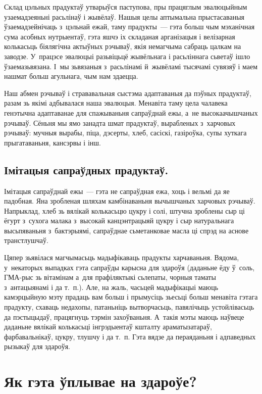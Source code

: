 Склад цэльных прадуктаў утварыўся паступова, пры працяглым эвалюцыйным узаемадзеяньні расьлінаў і жывёлаў. Нашыя целы аптымальна прыстасаваныя ўзаемадзейнічаць з~цэльнай ежай, таму прадукты~--- гэта больш чым мэханічная сума асобных нутрыентаў, гэта яшчэ іх складаная арганізацыя і велізарная колькасьць біялягічна актыўных рэчываў, якія немагчыма сабраць цалкам на заводзе. У~працэсе эвалюцыі разьвіцьцё жывёльнага і расьліннага сьветаў ішло ўзаемазьвязана. І~мы зьвязаныя з~расьлінамі й~жывёламі тысячамі сувязяў і маем нашмат больш агульнага, чым нам здаецца.

Наш абмен рэчываў і стрававальная сыстэма адаптаваныя да пэўных прадуктаў, разам зь якімі адбывалася наша эвалюцыя. Менавіта таму цела чалавека генэтычна адаптаванае для спажываньня сапраўднай ежы, а~не высокаачышчаных рэчываў. Сёньня мы ямо занадта шмат прадуктаў, вырабленых з~харчовых рэчываў: мучныя вырабы, піца, дэсерты, хлеб, сасіскі, газіроўка, супы хуткага прыгатаваньня, кансэрвы і інш.

\subsection{Імітацыя сапраўдных прадуктаў.}
Імітацыя сапраўднай ежы~--- гэта не сапраўдная ежа, хоць і вельмі да яе падобная. Яна зробленая шляхам камбінаваньня вычышчаных харчовых рэчываў. Напрыклад, хлеб зь вялікай колькасьцю цукру і солі, штучна зроблены сыр ці ёгурт з~сухога малака з~высокай канцэнтрацыяй цукру і сыр натуральнага высьпяваньня з~бактэрыямі, сапраўднае сьметанковае масла ці спрэд на аснове транстлушчаў.

Цяпер зьявілася магчымасьць мадыфікаваць прадукты харчаваньня. Вядома, у~некаторых выпадках гэта сапраўды карысна для здароўя (даданьне ёду ў~соль, ГМА-рыс зь вітамінам а~для прафіляктыкі сьлепаты, чорныя таматы з~антацыянамі і да т.~п.). Але, на жаль, часьцей мадыфікацыі маюць камэрцыйную мэту прадаць вам больш і прымусіць зьесьці больш менавіта гэтага прадукту, схаваць недахопы, патаньніць вытворчасьць, павялічыць устойлівасьць да пэстыцыдаў, працягнуць тэрмін захоўваньня. А~такія мэты маюць наўвеце даданьне вялікай колькасьці інгрэдыентаў кшталту араматызатараў, фарбавальнікаў, цукру, тлушчу і да т.~п. Гэта вядзе да пераяданьня і адпаведных рызыкаў для здароўя.

\section{Як гэта ўплывае на здароўе?}

